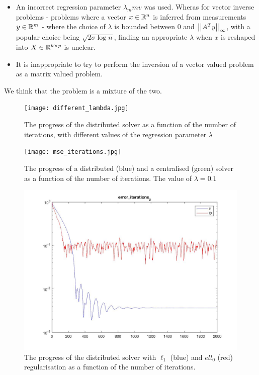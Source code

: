 \begin{itemize}
\item An incorrect regression parameter \(\lambda_mmv\) was used. Wheras for vector inverse problems - problems where a vector \(x \in {\mathbb{R}}^n\) is inferred from measurements \(y \in {\mathbb{R}}^m\) - where the choice of \(\lambda\) is bounded between \(0 \) and \(\left|\left|A^Ty\right|\right|_\infty\), with a popular choice being \(\sqrt{2\sigma \log{n}}\), finding an appropriate \(\lambda\) when \(x\) is reshaped into \(X \in {\mathbb{R}}^{k \times p}\) is unclear.
\item It is inappropriate to try to perform the inversion of a vector valued problem as a matrix valued problem.
\end{itemize}

We think that the problem is a mixture of the two. 

\begin{figure}[h]
\centering
\texttt{[image: different\_lambda.jpg]}
\caption{The progress of the distributed solver as a function of the number of iterations, with different values of the regression parameter \(\lambda\)}
\label{ch5:fig:differentLambda}
\end{figure}

\begin{figure}[h]
\centering
\texttt{[image: mse\_iterations.jpg]}
\caption{The progress of a distributed (blue) and a centralised (green) solver as a function of the number of iterations. The value of \(\lambda = 0.1\)}
\label{ch5:fig:erroriterations}
\end{figure}

\begin{figure}[h]
\centering
\includegraphics[height = 7.3 cm]{l1vsl0.jpg}
\caption{The progress of the distributed solver with \(\ell_1\) (blue) and \(ell_0\) (red) regularisation as a function of the number of iterations.}
\label{ch5:fig:l1l0}
\end{figure}

